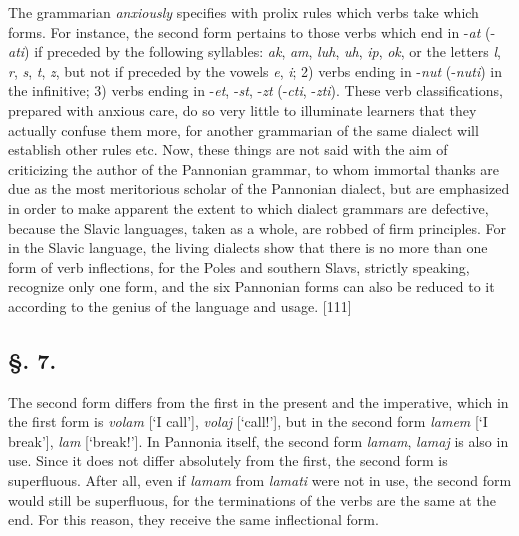 The grammarian \textit{anxiously} specifies with prolix rules which verbs take which forms. For instance, the second form pertains to those verbs which end in -\textit{at} (-\textit{ati}) if preceded by the following syllables: \textit{ak}, \textit{am}, \textit{luh}, \textit{uh}, \textit{ip}, \textit{ok}, or the letters \textit{l}, \textit{r}, \textit{s}, \textit{t}, \textit{z}, but not if preceded by the vowels \textit{e}, \textit{i}; 2) verbs ending in -\textit{nut} (-\textit{nuti}) in the infinitive; 3) verbs ending in -\textit{et}, -\textit{st}, -\textit{zt} (-\textit{cti}, -\textit{zti}). These verb classifications, prepared with anxious care, do so very little to illuminate learners that they actually confuse them more, for another grammarian of the same dialect will establish other rules etc. Now, these things are not said with the aim of criticizing the author of the Pannonian grammar, to whom immortal thanks are due as the most meritorious scholar of the Pannonian dialect, but are emphasized in order to make apparent the extent to which dialect grammars are defective, because the Slavic languages, taken as a whole, are robbed of firm principles. For in the Slavic language, the living dialects show that there is no more than one form of verb inflections, for the Poles and southern Slavs, strictly speaking, recognize only one form, and the six Pannonian forms can also be reduced to it according to the genius of the language and usage. [111]

\subsection*{\hspace*{\fill}§. 7.\hspace*{\fill}}

The second form differs from the first in the present and the imperative, which in the first form is \textit{volam} [‘I call’], \textit{volaj} [‘call!’], but in the second form \textit{lamem} [‘I break’], \textit{lam} [‘break!’]. In Pannonia itself, the second form \textit{lamam}, \textit{lamaj} is also in use. Since it does not differ absolutely from the first, the second form is superfluous. After all, even if \textit{lamam} from \textit{lamati} were not in use, the second form would still be superfluous, for the terminations of the verbs are the same at the end. For this reason, they receive the same inflectional form.

